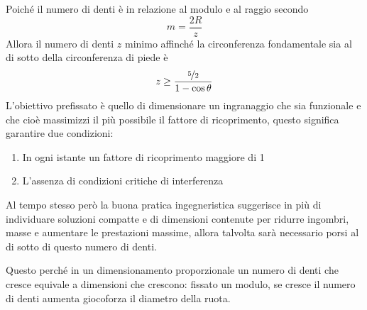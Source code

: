 \documentclass[a4paper, 15pt]{article}
\begin{document}
\begin{adjustwidth}{2in}{}
		Poiché il numero di denti è in relazione al modulo e al raggio secondo 
		\[m = \dfrac{2R}{z}\] 
		Allora il numero di denti $z$ minimo affinché la circonferenza fondamentale sia al di sotto della circonferenza di piede è
		\[z\geq \dfrac{\nicefrac{5}{2}}{1-\cos\theta}\]
\newpage		
		L'obiettivo prefissato è quello di dimensionare un ingranaggio che sia funzionale e che cioè massimizzi il più possibile il fattore di ricoprimento, questo significa garantire due condizioni:
		\begin{enumerate}
			\item In ogni istante un fattore di ricoprimento maggiore di 1
			\item L'assenza di condizioni critiche di interferenza
		\end{enumerate} 
		Al tempo stesso però la buona pratica ingegneristica suggerisce in più di individuare soluzioni compatte e di dimensioni contenute per ridurre ingombri, masse e aumentare le prestazioni massime, allora talvolta sarà necessario porsi al di sotto di questo numero di denti.
		
		Questo perché in un dimensionamento proporzionale un numero di denti che cresce equivale a dimensioni che crescono: fissato un modulo, se cresce il numero di denti aumenta giocoforza il diametro della ruota. \newline 
		

\end{adjustwidth}
\end{document}
